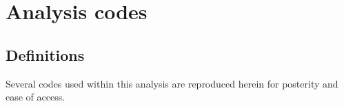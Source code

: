 %
%
%
%
%
%
%
%

%
%

\chapter{Analysis codes}

\section{Definitions}

Several codes used within this analysis are reproduced herein for posterity and ease of access.



%
% 
% 

